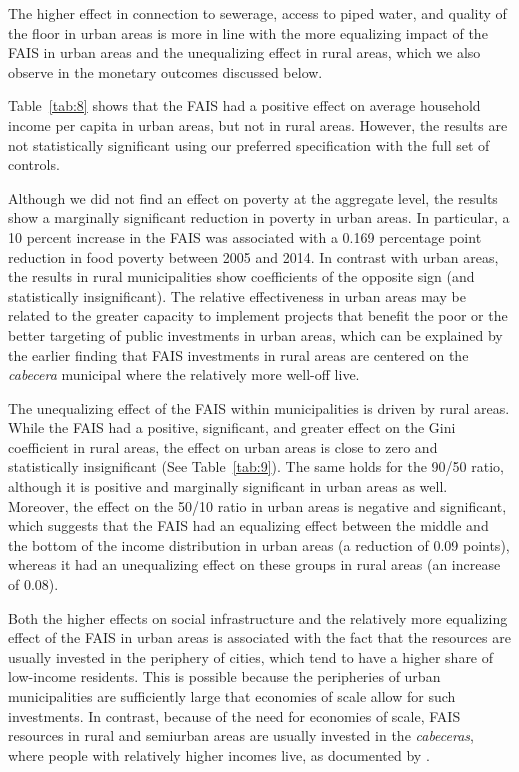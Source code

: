 \documentclass[dv_diss_main.tex]{subfiles}
\begin{document}
 The higher effect in connection to sewerage, access to piped water, and quality of the floor in urban areas is more in line with the more equalizing impact of the FAIS in urban areas and the unequalizing effect in rural areas, which we also observe in the monetary outcomes discussed below.

Table~\ref{tab:8} shows that the FAIS had a positive effect on average household income per capita in urban areas, but not in rural areas. However, the results are not statistically significant using our preferred specification with the full set of controls.

Although we did not find an effect on poverty at the aggregate level, the results show a marginally significant reduction in poverty in urban areas. In particular, a 10 percent increase in the FAIS was associated with a 0.169 percentage point reduction in food poverty between 2005 and 2014. In contrast with urban areas, the results in rural municipalities show coefficients of the opposite sign (and statistically insignificant). The relative effectiveness in urban areas may be related to the greater capacity to implement projects that benefit the poor or the better targeting of public investments in urban areas, which can be explained by the earlier finding that FAIS investments in rural areas are centered on the \textit{cabecera} municipal where the relatively more well-off live.

The unequalizing effect of the FAIS within municipalities is driven by rural areas. While the FAIS had a positive, significant, and greater effect on the Gini coefficient in rural areas, the effect on urban areas is close to zero and statistically insignificant (See Table~\ref{tab:9}). The same holds for the 90/50 ratio, although it is positive and marginally significant in urban areas as well. Moreover, the effect on the 50/10 ratio in urban areas is negative and significant, which suggests that the FAIS had an equalizing effect between the middle and the bottom of the income distribution in urban areas (a reduction of 0.09 points), whereas it had an unequalizing effect on these groups in rural areas (an increase of 0.08).

Both the higher effects on social infrastructure and the relatively more equalizing effect of the FAIS in urban areas is associated with the fact that the resources are usually invested in the periphery of cities, which tend to have a higher share of low-income residents. This is possible because the peripheries of urban municipalities are sufficiently large that economies of scale allow for such investments. In contrast, because of the need for economies of scale, FAIS resources in rural and semiurban areas are usually invested in the \textit{cabeceras}, where people with relatively higher incomes live, as documented by \cite{wellenstein2006social}.
\end{document}
